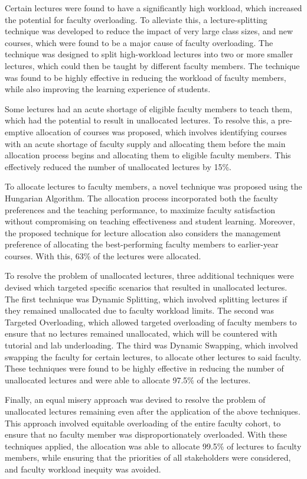 Certain lectures were found to have a significantly high workload, which increased the potential for faculty overloading. To alleviate this, a lecture-splitting technique was developed to reduce the impact of very large class sizes, and new courses, which were found to be a major cause of faculty overloading. The technique was designed to split high-workload lectures into two or more smaller lectures, which could then be taught by different faculty members. The technique was found to be highly effective in reducing the workload of faculty members, while also improving the learning experience of students.

Some lectures had an acute shortage of eligible faculty members to teach them, which had the potential to result in unallocated lectures. To resolve this, a pre-emptive allocation of courses was proposed, which involves identifying courses with an acute shortage of faculty supply and allocating them before the main allocation process begins and allocating them to eligible faculty members. This effectively reduced the number of unallocated lectures by 15\%.

To allocate lectures to faculty members, a novel technique was proposed using the Hungarian Algorithm. The allocation process incorporated both the faculty preferences and the teaching performance, to maximize faculty satisfaction without compromising on teaching effectiveness and student learning. Moreover, the proposed technique for lecture allocation also considers the management preference of allocating the best-performing faculty members to earlier-year courses. With this, 63\% of the lectures were allocated.

To resolve the problem of unallocated lectures, three additional techniques were devised which targeted specific scenarios that resulted in unallocated lectures. The first technique was Dynamic Splitting, which involved splitting lectures if they remained unallocated due to faculty workload limits. The second was Targeted Overloading, which allowed targeted overloading of faculty members to ensure that no lectures remained unallocated, which will be countered with tutorial and lab underloading. The third was Dynamic Swapping, which involved swapping the faculty for certain lectures, to allocate other lectures to said faculty. These techniques were found to be highly effective in reducing the number of unallocated lectures and were able to allocate 97.5\% of the lectures.

Finally, an equal misery approach was devised to resolve the problem of unallocated lectures remaining even after the application of the above techniques. This approach involved equitable overloading of the entire faculty cohort, to ensure that no faculty member was disproportionately overloaded. With these techniques applied, the allocation was able to allocate 99.5\% of lectures to faculty members, while ensuring that the priorities of all stakeholders were considered, and faculty workload inequity was avoided.

